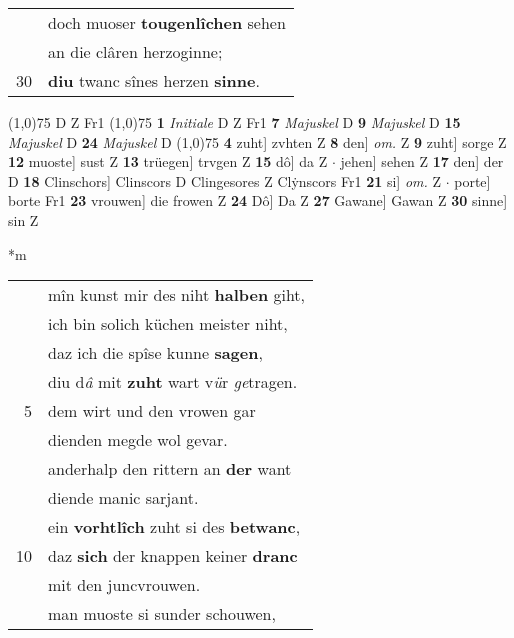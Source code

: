 \documentclass[8pt,a4paper,notitlepage]{article}
\begin{document}
\begin{table}[ht]
\begin{minipage}[t]{0.5\linewidth}
\begin{tabular}{rl}
 & doch muoser \textbf{tougenlîchen} sehen\\ 
 & an die clâren herzoginne;\\ 
30 & \textbf{diu} twanc sînes herzen \textbf{sinne}.\\ 
\end{tabular}
\scriptsize
\line(1,0){75} \newline
D Z Fr1 \newline
\line(1,0){75} \newline
\textbf{1} \textit{Initiale} D Z Fr1  \textbf{7} \textit{Majuskel} D  \textbf{9} \textit{Majuskel} D  \textbf{15} \textit{Majuskel} D  \textbf{24} \textit{Majuskel} D  \newline
\line(1,0){75} \newline
\textbf{4} zuht] zvhten Z \textbf{8} den] \textit{om.} Z \textbf{9} zuht] sorge Z \textbf{12} muoste] sust Z \textbf{13} trüegen] trvgen Z \textbf{15} dô] da Z  $\cdot$ jehen] sehen Z \textbf{17} den] der D \textbf{18} Clinschors] Clinscors D Clingesores Z Clẏnscors Fr1 \textbf{21} si] \textit{om.} Z  $\cdot$ porte] borte Fr1 \textbf{23} vrouwen] die frowen Z \textbf{24} Dô] Da Z \textbf{27} Gawane] Gawan Z \textbf{30} sinne] sin Z \newline
\end{minipage}
\hspace{0.5cm}
\begin{minipage}[t]{0.5\linewidth}
\small
\begin{center}*m
\end{center}
\begin{tabular}{rl}
 & mîn kunst mir des niht \textbf{halben} giht,\\ 
 & ich bin solich küchen meister niht,\\ 
 & daz ich die spîse kunne \textbf{sagen},\\ 
 & diu d\textit{â} mit \textbf{zuht} wart v\textit{ü}r \textit{ge}tragen.\\ 
5 & dem wirt und den vrowen gar\\ 
 & dienden megde wol gevar.\\ 
 & anderhalp den rittern an \textbf{der} want\\ 
 & diende manic sarjant.\\ 
 & ein \textbf{vorhtlîch} zuht si des \textbf{betwanc},\\ 
10 & daz \textbf{sich} der knappen keiner \textbf{dranc}\\ 
 & mit den juncvrouwen.\\ 
 & man muoste si sunder schouwen,\\ 

\end{tabular}
\end{minipage}
\end{table}
\end{document}
